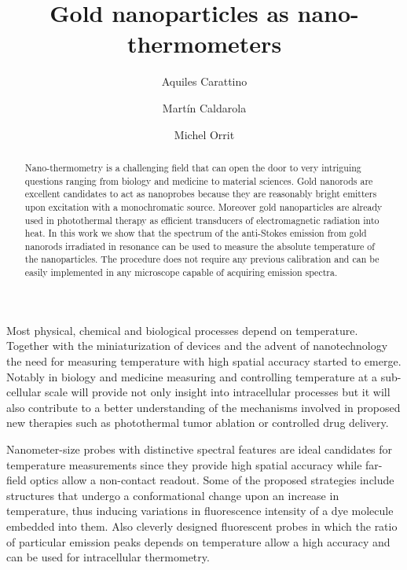 \documentclass[journal=nalefd,manuscript=letter]{achemso}
\author{Aquiles Carattino}
\affiliation[Leiden]
{Huygens-Kamerlingh Onnes Lab, 2300RA Leiden, The Netherlands}
\author{Mart\'in Caldarola}
\affiliation[Leiden]
{Huygens-Kamerlingh Onnes Lab, 2300RA Leiden, The Netherlands}
\author{Michel Orrit}
\affiliation[Leiden]
{Huygens-Kamerlingh Onnes Lab, 2300RA Leiden, The Netherlands}
\title{Gold nanoparticles as nano-thermometers}
\begin{document}
\maketitle

\begin{abstract}
Nano-thermometry is a challenging field that can open the door
to very intriguing questions ranging from biology and medicine to material sciences.
Gold nanorods are excellent candidates to act as nanoprobes because they are
reasonably bright emitters upon excitation with a monochromatic source.
Moreover gold nanoparticles are already used in photothermal therapy as efficient
transducers of electromagnetic radiation into heat. In this work we show that
the spectrum of the anti-Stokes emission from gold nanorods irradiated in
resonance can be used to measure the absolute temperature of the nanoparticles.
The procedure does not require any previous calibration and can be easily
implemented in any microscope capable of acquiring emission spectra. 

\end{abstract}



Most physical, chemical and biological processes depend on
temperature. Together with the miniaturization of devices and the advent of
nanotechnology the need for measuring temperature with high spatial accuracy
started to emerge. Notably in biology\cite{Yang2011a,Hrelescu2010} and
medicine\cite{Li2013c} measuring and controlling temperature at a sub-cellular scale
will provide not only insight into intracellular processes but it will
also contribute to a better understanding of the mechanisms involved in proposed
new therapies such as photothermal tumor ablation\cite{Gobin2007} or controlled
drug delivery\cite{Huang2006,Huo2014}.

Nanometer-size probes with distinctive spectral features are ideal candidates for temperature
measurements since they provide high spatial accuracy while far-field optics
allow a non-contact readout. Some of the proposed strategies include structures
that undergo a conformational change upon an increase in
temperature\cite{Ebrahimi2014}, thus inducing variations in fluorescence
intensity of a dye molecule embedded into them. Also cleverly designed
fluorescent probes\cite{Vetrone2010} in which the ratio of particular emission
peaks depends on temperature allow a high accuracy and can be used for
intracellular thermometry.
\end{document}
